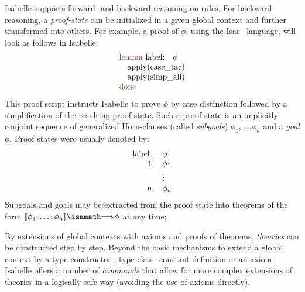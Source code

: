 Isabelle supports forward- and backward reasoning on rules.  For
backward-reasoning, a \emph{proof-state} can be initialized in a given 
global context and further transformed into others. For example, a proof of $\phi$, using
the Isar~\cite{wenzel:isabelleisar:2002} language, will look as
follows in Isabelle:
\begin{gather}
  \begin{array}{l}
    \Lemma{label} \phi\\
    \quad\apply{case\_tac}\\
    \quad\apply{simp\_all}\\
  \done
  \end{array}
\end{gather}
This proof script instructs Isabelle to prove $\phi$ by case
distinction followed by a simplification of the resulting proof state.
Such a proof state is an implicitly conjoint sequence of generalized
Horn-clauses (called \emph{subgoals}) $\phi_1$, \ldots,$\phi_n$ and a
\emph{goal} $\phi$. Proof states were usually denoted by:
\begin{gather}
\begin{array}{rl}
\text{label}:& \phi \\
 1.& \phi_1 \\
    &\vdots \\
 n.& \phi_n\\
\end{array}
\end{gather}
Subgoals and goals may be extracted from the proof state into theorems
of the form $\semantics{\phi_1 ; \ldots; \phi_n}\Implies \phi$ at any
time;

By extensions of global contexts with axioms and proofs of theorems,
\emph{theories} can be constructed step by step. Beyond the basic
mechanisms to extend a global context by a type-constructor-, type-class-
constant-definition or an axiom, Isabelle offers a number of 
\emph{commands} that allow for more complex extensions of theories in
a logically safe way (avoiding the use of axioms directly).

